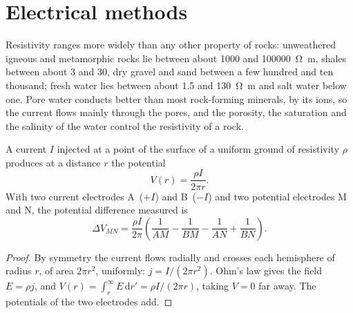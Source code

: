 \section{Electrical methods}\label{sec:b3:field-lab-methods-3:electrical}

Resistivity ranges more widely than any other property of rocks:
unweathered igneous and metamorphic rocks lie between about
\num{1000} and \qty{100000}{\ohm\metre}, shales between about
\num{3} and \num{30}, dry gravel and sand between a few hundred and ten
thousand; fresh water lies between about \num{1.5} and
\qty{130}{\ohm\metre} and salt water below one. Pore water conducts
better than most rock-forming minerals, by its ions, so the current
flows mainly through the pores, and the porosity, the saturation and
the salinity of the water control the resistivity of a rock.

\begin{theorem}\label{thm:b3:field-lab-methods-3:point-source}
A current $I$ injected at a point of the surface of a uniform ground of
resistivity $\rho$ produces at a distance $r$ the potential
\[
V(r) = \frac{\rho I}{2\pi r} .
\]
With two current electrodes A~($+I$) and B~($-I$) and two potential
electrodes M and N, the potential difference measured is
\[
\Delta V_{MN} = \frac{\rho I}{2\pi}\left(\frac{1}{AM} - \frac{1}{BM}
               - \frac{1}{AN} + \frac{1}{BN}\right) .
\]
\end{theorem}

\begin{proof}
By symmetry the current flows radially and crosses each hemisphere of
radius $r$, of area $2\pi r^2$, uniformly: $j = I/(2\pi r^2)$. Ohm's law
gives the field $E = \rho j$, and $V(r) = \int_r^\infty E\,\mathrm{d}r'
= \rho I/(2\pi r)$, taking $V = 0$ far away. The potentials of the two
electrodes add.
\end{proof}

